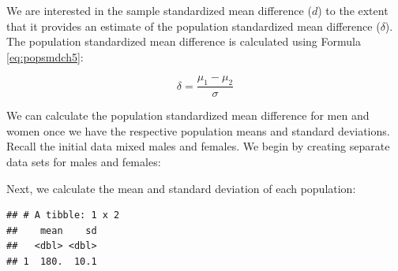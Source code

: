 \documentclass[
]{krantz}
\makeatletter
\newenvironment{Shaded}{\begin{snugshade}}{\end{snugshade}}
\newcommand{\DataTypeTok}[1]{\textcolor[rgb]{0.27,0.27,0.27}{#1}}
\newcommand{\KeywordTok}[1]{\textcolor[rgb]{0.27,0.27,0.27}{\textbf{#1}}}
\newcommand{\NormalTok}[1]{#1}
\newcommand{\OperatorTok}[1]{\textcolor[rgb]{0.43,0.43,0.43}{\textbf{#1}}}
\newcommand{\StringTok}[1]{\textcolor[rgb]{0.5,0.5,0.5}{#1}}
\newenvironment{kframe}{%
\medskip{}
\setlength{\fboxsep}{.8em}
 \def\at@end@of@kframe{}%
 \ifinner\ifhmode%
  \def\at@end@of@kframe{\end{minipage}}%
  \begin{minipage}{\columnwidth}%
 \fi\fi%
 \def\FrameCommand##1{\hskip\@totalleftmargin \hskip-\fboxsep
 \colorbox{shadecolor}{##1}\hskip-\fboxsep
     \hskip-\linewidth \hskip-\@totalleftmargin \hskip\columnwidth}%
 \MakeFramed {\advance\hsize-\width
   \@totalleftmargin\z@ \linewidth\hsize
   \@setminipage}}%
 {\par\unskip\endMakeFramed%
 \at@end@of@kframe}
\renewenvironment{Shaded}{\begin{kframe}}{\end{kframe}}
\makeatother
\begin{document}
We are interested in the sample standardized mean difference (\(d\)) to the extent that it provides an estimate of the population standardized mean difference (\(\delta\)). The population standardized mean difference is calculated using Formula \eqref{eq:popsmdch5}:

\begin{equation} 
\delta  = \frac{\mu_{1} - \mu_{2}}{\sigma} 
      \label{eq:popsmdch5}
\end{equation}

We can calculate the population standardized mean difference for men and women once we have the respective population means and standard deviations. Recall the initial data mixed males and females. We begin by creating separate data sets for males and females:

\begin{Shaded}
\end{Shaded}

Next, we calculate the mean and standard deviation of each population:

\begin{Shaded}
\end{Shaded}

\begin{verbatim}
## # A tibble: 1 x 2
##    mean    sd
##   <dbl> <dbl>
## 1  180.  10.1
\end{verbatim}

\begin{Shaded}
\end{Shaded}
\end{document}
